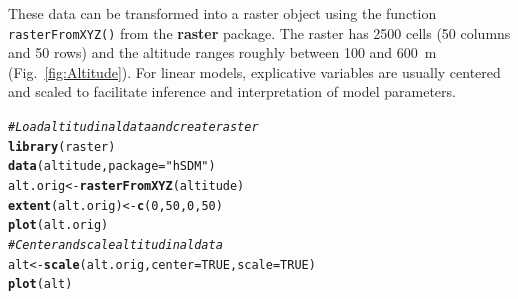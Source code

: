 \documentclass[a4paper, 12pt, leqno]{article}\usepackage[]{graphicx}\usepackage[]{color}
\makeatletter
\newcommand{\hlnum}[1]{\textcolor[rgb]{0.686,0.059,0.569}{#1}}%
\newcommand{\hlstr}[1]{\textcolor[rgb]{0.192,0.494,0.8}{#1}}%
\newcommand{\hlcom}[1]{\textcolor[rgb]{0.678,0.584,0.686}{\textit{#1}}}%
\newcommand{\hlstd}[1]{\textcolor[rgb]{0.345,0.345,0.345}{#1}}%
\newcommand{\hlkwb}[1]{\textcolor[rgb]{0.69,0.353,0.396}{#1}}%
\newcommand{\hlkwc}[1]{\textcolor[rgb]{0.333,0.667,0.333}{#1}}%
\newcommand{\hlkwd}[1]{\textcolor[rgb]{0.737,0.353,0.396}{\textbf{#1}}}%
\newenvironment{kframe}{%
 \def\at@end@of@kframe{}%
 \ifinner\ifhmode%
  \def\at@end@of@kframe{\end{minipage}}%
  \begin{minipage}{\columnwidth}%
 \fi\fi%
 \def\FrameCommand##1{\hskip\@totalleftmargin \hskip-\fboxsep
 \colorbox{shadecolor}{##1}\hskip-\fboxsep
     \hskip-\linewidth \hskip-\@totalleftmargin \hskip\columnwidth}%
 \MakeFramed {\advance\hsize-\width
   \@totalleftmargin\z@ \linewidth\hsize
   \@setminipage}}%
 {\par\unskip\endMakeFramed%
 \at@end@of@kframe}
\newenvironment{knitrout}{}{} %
\makeatother
\begin{document}
These data can be transformed into a raster object using the function
\texttt{rasterFromXYZ()} from the \textbf{raster} package. The raster has 2500 cells (50
columns and 50 rows) and the altitude ranges roughly between 100 and 600~m
(Fig.~\ref{fig:Altitude}). For linear models, explicative variables are usually centered
and scaled to facilitate inference and interpretation of model parameters.

\begin{knitrout}\small
{}\color{fgcolor}\begin{kframe}
\begin{alltt}
\hlcom{# Load altitudinal data and create raster}
\hlkwd{library}\hlstd{(raster)}
\hlkwd{data}\hlstd{(altitude,}\hlkwc{package}\hlstd{=}\hlstr{"hSDM"}\hlstd{)}
\hlstd{alt.orig} \hlkwb{<-} \hlkwd{rasterFromXYZ}\hlstd{(altitude)}
\hlkwd{extent}\hlstd{(alt.orig)} \hlkwb{<-} \hlkwd{c}\hlstd{(}\hlnum{0}\hlstd{,}\hlnum{50}\hlstd{,}\hlnum{0}\hlstd{,}\hlnum{50}\hlstd{)}
\hlkwd{plot}\hlstd{(alt.orig)}
\hlcom{# Center and scale altitudinal data}
\hlstd{alt} \hlkwb{<-} \hlkwd{scale}\hlstd{(alt.orig,}\hlkwc{center}\hlstd{=}\hlnum{TRUE}\hlstd{,}\hlkwc{scale}\hlstd{=}\hlnum{TRUE}\hlstd{)}
\hlkwd{plot}\hlstd{(alt)}
\end{alltt}
\end{kframe}
\end{knitrout}
\end{document}
